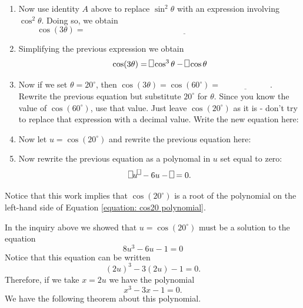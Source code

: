 \documentclass[11pt]{article}
\newenvironment{task}
	{\begin{mdframed}[linecolor=lightgray, linewidth=3pt]\raggedright}
	{\end{mdframed}}
\theoremstyle{definition}
\begin{document}
\begin{task}
\begin{enumerate}
    \item Now use identity $A$ above to replace $\sin^2\theta$ with an expression involving $\cos^2\theta$. Doing so, we obtain
      \[ \cos(3\theta) =\underline{\hspace{4in}} \]
    \item Simplifying the previous expression we obtain
      \[ \cos(3\theta) = \framebox(5,8){}\cos^3\theta - \framebox(5,8){}\cos\theta\]
    \item Now if we set $\theta = 20^\circ$, then $\cos(3\theta) = \cos(60^\circ) = \underline{\hspace{1in}}$. Rewrite the previous
      equation but substitute $20^\circ$ for $\theta$. Since you know the value of $\cos(60^\circ)$, use that value. Just leave
      $\cos(20^\circ)$ as it is - don't try to replace that expression with a decimal value. Write
      the new equation here:
      \[ \]
    \item Now let $u = \cos(20^\circ)$ and rewrite the previous equation here:
      \[ \]
    \item Now rewrite the previous equation as a polynomal in $u$ set equal to zero:
      \begin{equation}
       \framebox(5,8){}u^{\framebox(4,6){}} - 6u - \framebox(5,8){} = 0. 
        \label{equation: cos20 polynomial}
      \end{equation}
  \end{enumerate}
  Notice that this work implies that $\cos(20^\circ)$ is a root of the polynomial on the left-hand side of Equation \ref{equation: cos20 polynomial}.
\end{task}

In the inquiry above we showed that $u = \cos(20^\circ)$ must be a solution to the equation
\[ 8u^3 - 6u - 1 = 0\]
Notice that this equation can be written
 \[ (2u)^3 - 3(2u) - 1 =0. \]
 Therefore, if we take $x = 2u$ we have the polynomial
 \[ x^3 - 3x - 1 =0. \]
 We have the following theorem about this polynomial.
\end{document}
